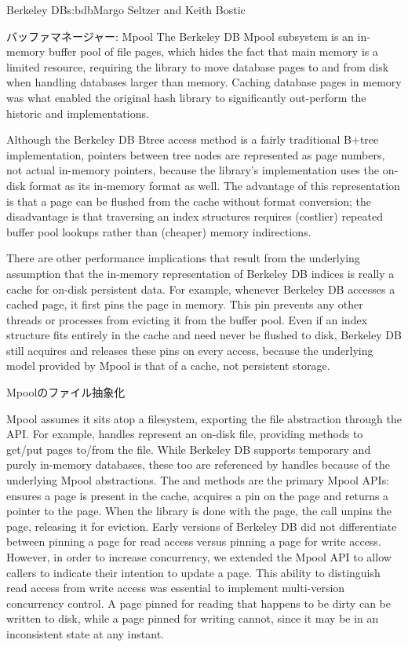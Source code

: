 \begin{aosachapter}{Berkeley DB}{s:bdb}{Margo Seltzer and Keith Bostic}
\begin{aosasect1}{バッファマネージャー: Mpool}
The Berkeley DB Mpool subsystem is an in-memory buffer pool of file
pages, which hides the fact that main memory is a limited resource,
requiring the library to move database pages to and from disk when
handling databases larger than memory. Caching database pages in
memory was what enabled the original hash library to significantly
out-perform the historic  and 
implementations.

Although the Berkeley DB Btree access method is a fairly traditional
B+tree implementation, pointers between tree nodes are represented as
page numbers, not actual in-memory pointers, because the library's
implementation uses the on-disk format as its in-memory format
as well. The advantage of this representation is that a page can be
flushed from the cache without format conversion; the disadvantage is
that traversing an index structures requires (costlier) repeated
buffer pool lookups rather than (cheaper) memory indirections.

There are other performance implications that result from the
underlying assumption that the in-memory representation of Berkeley DB
indices is really a cache for on-disk persistent data. For example,
whenever Berkeley DB accesses a cached page, it first pins the page in
memory. This pin prevents any other threads or processes from 
evicting it from the buffer pool. Even if an index
structure fits entirely in the cache and need never be flushed to
disk, Berkeley DB still acquires and releases these pins on every
access, because the underlying model provided by Mpool is that of a
cache, not persistent storage.

\begin{aosasect2}{Mpoolのファイル抽象化}

Mpool assumes it sits atop a filesystem, exporting the file
abstraction through the API\@. For example,  handles
represent an on-disk file, providing methods to get/put pages to/from
the file.  While Berkeley DB supports temporary and purely in-memory
databases, these too are referenced by  handles
because of the underlying Mpool abstractions. The  and
 methods are the primary Mpool APIs:  ensures a
page is present in the cache, acquires a pin on the page and returns a
pointer to the page.  When the library is done with the page, the
 call unpins the page, releasing it for 
eviction.  Early versions of Berkeley DB did not differentiate between
pinning a page for read access versus pinning a page for write
access. However, in order to increase concurrency, we extended the
Mpool API to allow callers to indicate their intention to update a
page. This ability to distinguish read access from write access was
essential to implement multi-version concurrency control.
A page pinned for reading that happens to be dirty can be written to
disk, while a page pinned for writing cannot, since it may be in an
inconsistent state at any instant.


\end{aosasect2}
\end{aosasect1}
\end{aosachapter}
